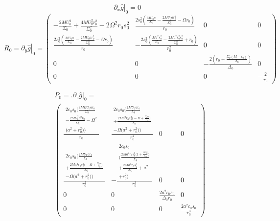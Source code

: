 \documentclass[english]{article}
\begin{document}
\[
\left.\partial_{x}\hat{g}\right|_{0}=0
\]
\[
R_{0}=\left.\partial_{y}\hat{g}\right|_{0}=\begin{pmatrix}-\frac{2MU^{2}_{0}}{\Sigma_{0}}+\frac{4MU^{2}_{0}r^{2}_{0}}{\Sigma^{2}_{0}}-2\Omega^{2}r_{0}s^{2}_{0} & \frac{2s^{2}_{0}\left(\frac{MU_{0}a}{\Sigma_{0}}-\frac{2MU_{0}ar^{2}_{0}}{\Sigma^{2}_{0}}-\Omega r_{0}\right)}{r_{0}} & 0 & 0\\
\frac{2s^{2}_{0}\left(\frac{MU_{0}a}{\Sigma_{0}}-\frac{2MU_{0}ar^{2}_{0}}{\Sigma^{2}_{0}}-\Omega r_{0}\right)}{r_{0}} & -\frac{2s^{2}_{0}\left(\frac{Ma^{2}s^{2}_{0}}{\Sigma_{0}}-\frac{2Ma^{2}r^{2}_{0}s^{2}_{0}}{\Sigma^{2}_{0}}+r_{0}\right)}{r^{2}_{0}} & 0 & 0\\
0 & 0 & -\frac{2\left(r_{0}+\frac{\Sigma_{0}\left(M-r_{0}\right)}{\Delta_{0}}\right)}{\Delta_{0}} & 0\\
0 & 0 & 0 & -\frac{2}{r_{0}}
\end{pmatrix}
\]

\begin{align*}
 & P_{0}=\biggl.\partial_{z}\hat{g}\biggr|_{0}=\\
 & \begin{pmatrix}\frac{\begin{gathered}2c_{0}s_{0}\biggl(\frac{4M\Omega U_{0}ar_{0}}{\Sigma_{0}}\\
-\frac{2MU^{2}_{0}a^{2}r_{0}}{\Sigma^{2}_{0}}-\Omega^{2}\\
\biggl(a^{2}+r^{2}_{0}\biggr)\biggr)
\end{gathered}
}{r_{0}} & \frac{\begin{gathered}2c_{0}s_{0}\biggl(\frac{2MU_{0}ar_{0}}{\Sigma_{0}}\\
+\frac{2Ma^{2}r_{0}s^{2}_{0}\biggl(-\Omega+\frac{U_{0}a}{\Sigma_{0}}\biggr)}{\Sigma_{0}}\\
-\Omega\biggl(a^{2}+r^{2}_{0}\biggr)\biggr)
\end{gathered}
}{r^{2}_{0}} & 0 & 0\\
\frac{\begin{gathered}2c_{0}s_{0}\biggl(\frac{2MU_{0}ar_{0}}{\Sigma_{0}}\\
+\frac{2Ma^{2}r_{0}s^{2}_{0}\biggl(-\Omega+\frac{U_{0}a}{\Sigma_{0}}\biggr)}{\Sigma_{0}}\\
-\Omega\biggl(a^{2}+r^{2}_{0}\biggr)\biggr)
\end{gathered}
}{r^{2}_{0}} & -\frac{\begin{gathered}2c_{0}s_{0}\\
\biggl(\frac{2Ma^{2}r_{0}s^{2}_{0}\biggl(1+\frac{a^{2}s^{2}_{0}}{\Sigma_{0}}\biggr)}{\Sigma_{0}}\\
+\frac{2Ma^{2}r_{0}s^{2}_{0}}{\Sigma_{0}}+a^{2}\\
+r^{2}_{0}\biggr)
\end{gathered}
}{r^{3}_{0}} & 0 & 0\\
0 & 0 & \frac{2a^{2}c_{0}s_{0}}{\Delta_{0}r_{0}} & 0\\
0 & 0 & 0 & \frac{2a^{2}c_{0}s_{0}}{r^{3}_{0}}
\end{pmatrix}
\end{align*}
\end{document}
